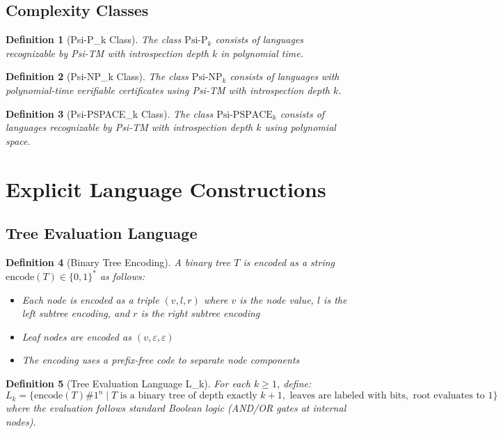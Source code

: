 \documentclass[11pt]{article}
\newtheorem{definition}{Definition}
\begin{document}
\subsection{Complexity Classes}

\begin{definition}[Psi-P_k Class]
The class $\text{Psi-P}_k$ consists of languages recognizable by Psi-TM with introspection depth $k$ in polynomial time.
\end{definition}

\begin{definition}[Psi-NP_k Class]
The class $\text{Psi-NP}_k$ consists of languages with polynomial-time verifiable certificates using Psi-TM with introspection depth $k$.
\end{definition}

\begin{definition}[Psi-PSPACE_k Class]
The class $\text{Psi-PSPACE}_k$ consists of languages recognizable by Psi-TM with introspection depth $k$ using polynomial space.
\end{definition}

\section{Explicit Language Constructions}

\subsection{Tree Evaluation Language}

\begin{definition}[Binary Tree Encoding]
A binary tree $T$ is encoded as a string $\text{encode}(T) \in \{0,1\}^*$ as follows:
\begin{itemize}
\item Each node is encoded as a triple $(v, l, r)$ where $v$ is the node value, $l$ is the left subtree encoding, and $r$ is the right subtree encoding
\item Leaf nodes are encoded as $(v, \varepsilon, \varepsilon)$
\item The encoding uses a prefix-free code to separate node components
\end{itemize}
\end{definition}

\begin{definition}[Tree Evaluation Language L_k]
For each $k \geq 1$, define:
$$L_k = \{\text{encode}(T)\#1^n \mid T \text{ is a binary tree of depth exactly } k+1, \text{ leaves are labeled with bits}, \text{ root evaluates to } 1\}$$
where the evaluation follows standard Boolean logic (AND/OR gates at internal nodes).
\end{definition}
\end{document}
